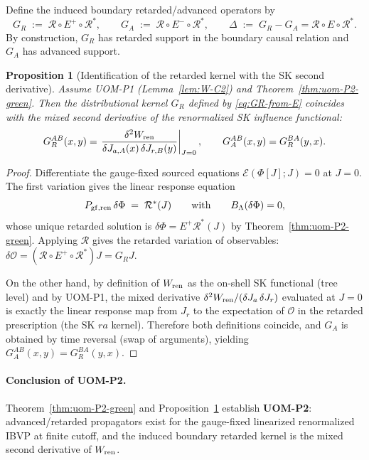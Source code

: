 \documentclass[10pt]{article}
\theoremstyle{definition}
\theoremstyle{plain}
\newtheorem{proposition}{Proposition}[section]
\begin{document}
Define the induced boundary retarded/advanced operators by
\begin{equation}
G_R\;:=\;\mathcal R\circ E^+\circ \mathcal R^\ast,
\qquad
G_A\;:=\;\mathcal R\circ E^-\circ \mathcal R^\ast,
\qquad
\Delta\;:=\;G_R-G_A=\mathcal R\circ E\circ \mathcal R^\ast.
\label{eq:GR-from-E}
\end{equation}
By construction, $G_R$ has retarded support in the boundary causal relation and $G_A$ has advanced support.

\begin{proposition}[Identification of the retarded kernel with the SK second derivative]
\label{prop:GR-identification}
Assume UOM-P1 (Lemma~\ref{lem:W-C2}) and Theorem~\ref{thm:uom-P2-green}. Then the distributional kernel
$G_R$ defined by \eqref{eq:GR-from-E} coincides with the mixed second derivative of the renormalized SK influence functional:
\[
G_R^{AB}(x,y)
=
\left.\frac{\delta^2 W_{\rm ren}}{\delta J_{a,A}(x)\,\delta J_{r,B}(y)}\right|_{J=0},
\qquad
G_A^{AB}(x,y)=G_R^{BA}(y,x).
\]
\end{proposition}

\begin{proof}
Differentiate the gauge-fixed sourced equations $\mathcal E(\Phi[J];J)=0$ at $J=0$.  The first variation gives the linear response equation
\[
P_{\rm gf,ren}\,\delta\Phi \;=\; \mathcal R^\ast(J)\qquad\text{with}\qquad B_\Lambda(\delta\Phi)=0,
\]
whose unique retarded solution is $\delta\Phi=E^+\mathcal R^\ast(J)$ by Theorem~\ref{thm:uom-P2-green}.
Applying $\mathcal R$ gives the retarded variation of observables: $\delta\mathcal O = (\mathcal R\circ E^+\circ\mathcal R^\ast)J = G_R J$.

On the other hand, by definition of $W_{\rm ren}$ as the on-shell SK functional (tree level) and by UOM-P1,
the mixed derivative $\delta^2 W_{\rm ren}/(\delta J_a\,\delta J_r)$ evaluated at $J=0$ is exactly the linear response map
from $J_r$ to the expectation of $\mathcal O$ in the retarded prescription (the SK $ra$ kernel). Therefore both definitions coincide,
and $G_A$ is obtained by time reversal (swap of arguments), yielding $G_A^{AB}(x,y)=G_R^{BA}(y,x)$.
\end{proof}

\paragraph{Conclusion of UOM-P2.}
Theorem~\ref{thm:uom-P2-green} and Proposition~\ref{prop:GR-identification} establish \textbf{UOM-P2}: advanced/retarded propagators exist
for the gauge-fixed linearized renormalized IBVP at finite cutoff, and the induced boundary retarded kernel is the mixed second derivative of
$W_{\rm ren}$.
\end{document}
